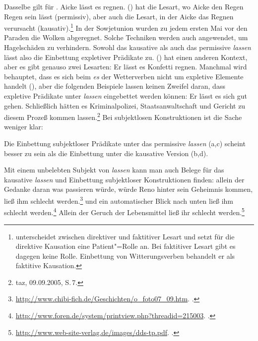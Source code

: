 \zl
Dasselbe gilt für .
\ea
\label{bsp-Aicke-laesst-es-regnen}
Aicke lässt es regnen.
\z
() hat die Lesart, wo Aicke den Regen Regen sein lässt (permissiv), aber auch die
Lesart, in der Aicke das Regnen verursacht (kausativ).\footnote{
        \citet[]{Gunkel2003b} unterscheidet zwischen direktiver und
        faktitiver Lesart und setzt für die direktive Kausation eine Patient"=Rolle
        an. Bei faktitiver Lesart gibt es dagegen keine Rolle. Einbettung
        von Witterungsverben behandelt er als faktitive Kausation.%
}
In der Sowjetunion wurden zu jedem ersten Mai vor den Paraden die Wolken abgeregnet.
Solche Techniken werden auch angewendet, um Hagelschäden zu verhindern.
Sowohl das kausative als auch das permissive \emph{lassen} lässt also die
Einbettung expletiver Prädikate zu.
() hat einen anderen Kontext, aber es gibt genauso zwei Lesarten:
\ea
Er lässt es Konfetti regnen.
\z
Manchmal wird behauptet, dass es sich beim \emph{es} der Wetterverben
nicht um expletive Elemente handelt (\citealp[]{Paul1919a}),
aber die folgenden Beispiele lassen keinen Zweifel daran, dass expletive Prädikate unter
\emph{lassen} eingebettet werden können:
\eal
\ex Er lässt es        sich gut  gehen.
\ex Schließlich hätten es Kriminalpolizei, Staatsanwaltschaft und Gericht zu diesem Prozeß kommen lassen.\footnote{
  taz, 09.09.2005, S.\,7.
}
\zl
%
Bei subjektlosen Konstruktionen ist die Sache weniger klar:

\eal
{}
\zl
Die Einbettung subjektloser Prädikate unter das permissive \emph{lassen} (a,c)
scheint besser zu sein als die Einbettung unter die kausative Version (b,d).

Mit einem unbelebten Subjekt von \emph{lassen} kann man auch Belege für
das kausative \emph{lassen} und Einbettung subjektloser Konstruktionen finden:
\eal
\ex allein der Gedanke daran was passieren würde, würde Reno hinter sein Geheimnis kommen, ließ ihm schlecht werden.\footnote{%
\url{http://www.chibi-fich.de/Geschichten/o_foto07_09.htm}. .%
}
\ex und ein automatischer Blick nach unten ließ ihm schlecht werden.\footnote{
\url{http://www.foren.de/system/printview.php?threadid=215003}. .
}
\ex Allein der Geruch der Lebensmittel ließ ihr schlecht werden.\footnote{
\url{http://www.web-site-verlag.de/images/dds-tp.pdf}. .
}
\zl


